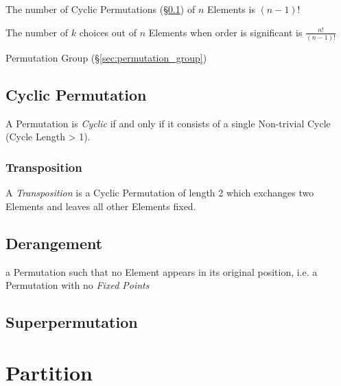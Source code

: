 The number of Cyclic Permutations (\S\ref{sec:cyclic_permutation}) of
$n$ Elements is $(n-1)!$

The number of $k$ choices out of $n$ Elements when order is
significant is $\frac{n!}{(n-1)!}$

Permutation Group (\S\ref{sec:permutation_group})



\subsection{Cyclic Permutation}\label{sec:cyclic_permutation}

A Permutation is \emph{Cyclic} if and only if it consists of a single
Non-trivial Cycle (Cycle Length > 1).



\subsubsection{Transposition}\label{sec:transposition}

A \emph{Transposition} is a Cyclic Permutation of length 2 which
exchanges two Elements and leaves all other Elements fixed.



\subsection{Derangement}\label{sec:derangement}

a Permutation such that no Element appears in its original position, i.e. a
Permutation with no \emph{Fixed Points}



\subsection{Superpermutation}\label{sec:superpermutation}



\section{Partition}\label{sec:partition}

